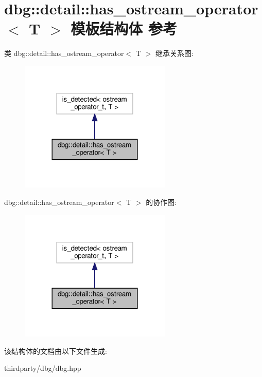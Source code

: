 \hypertarget{structdbg_1_1detail_1_1has__ostream__operator}{}\section{dbg\+:\+:detail\+:\+:has\+\_\+ostream\+\_\+operator$<$ T $>$ 模板结构体 参考}
\label{structdbg_1_1detail_1_1has__ostream__operator}


类 dbg\+:\+:detail\+:\+:has\+\_\+ostream\+\_\+operator$<$ T $>$ 继承关系图\+:
\nopagebreak
\begin{figure}[H]
\begin{center}
\leavevmode
\includegraphics[width=204pt]{structdbg_1_1detail_1_1has__ostream__operator__inherit__graph}
\end{center}
\end{figure}


dbg\+:\+:detail\+:\+:has\+\_\+ostream\+\_\+operator$<$ T $>$ 的协作图\+:
\nopagebreak
\begin{figure}[H]
\begin{center}
\leavevmode
\includegraphics[width=204pt]{structdbg_1_1detail_1_1has__ostream__operator__coll__graph}
\end{center}
\end{figure}


该结构体的文档由以下文件生成\+:\begin{DoxyCompactItemize}
\item 
thirdparty/dbg/dbg.\+hpp\end{DoxyCompactItemize}
